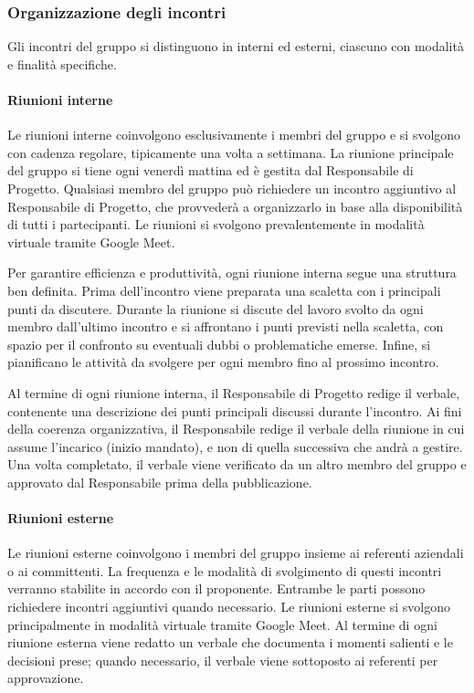 \documentclass[a4paper, 11pt, oneside]{scrartcl} %
\begin{document}
\subsubsection{Organizzazione degli incontri}
Gli incontri del gruppo si distinguono in interni ed esterni, ciascuno con modalità e finalità specifiche.

\paragraph{Riunioni interne}
Le riunioni interne coinvolgono esclusivamente i membri del gruppo e si svolgono con cadenza regolare, tipicamente una volta a settimana.
La riunione principale del gruppo si tiene ogni venerdì mattina ed è gestita dal Responsabile di Progetto.
Qualsiasi membro del gruppo può richiedere un incontro aggiuntivo al Responsabile di Progetto, che provvederà a organizzarlo in base alla disponibilità di tutti i partecipanti.
Le riunioni si svolgono prevalentemente in modalità virtuale tramite Google Meet.

Per garantire efficienza e produttività, ogni riunione interna segue una struttura ben definita.
Prima dell'incontro viene preparata una scaletta con i principali punti da discutere.
Durante la riunione si discute del lavoro svolto da ogni membro dall'ultimo incontro e si affrontano i punti previsti nella scaletta, con spazio per il confronto su eventuali dubbi o problematiche emerse.
Infine, si pianificano le attività da svolgere per ogni membro fino al prossimo incontro.

Al termine di ogni riunione interna, il Responsabile di Progetto redige il verbale, contenente una descrizione dei punti principali discussi durante l'incontro.
Ai fini della coerenza organizzativa, il Responsabile redige il verbale della riunione in cui assume l'incarico (inizio mandato), e non di quella successiva che andrà a gestire.
Una volta completato, il verbale viene verificato da un altro membro del gruppo e approvato dal Responsabile prima della pubblicazione.

\paragraph{Riunioni esterne}
Le riunioni esterne coinvolgono i membri del gruppo insieme ai referenti aziendali o ai committenti.
La frequenza e le modalità di svolgimento di questi incontri verranno stabilite in accordo con il proponente.
Entrambe le parti possono richiedere incontri aggiuntivi quando necessario.
Le riunioni esterne si svolgono principalmente in modalità virtuale tramite Google Meet.
Al termine di ogni riunione esterna viene redatto un verbale che documenta i momenti salienti e le decisioni prese; quando necessario, il verbale viene sottoposto ai referenti per approvazione.
\end{document}
